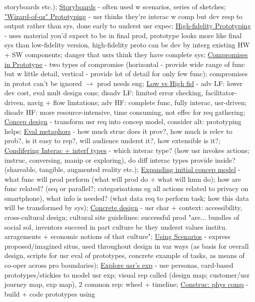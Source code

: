 \documentclass[a4paper]{article}
\begin{document}
\begin{multicols}{3}
        storyboards etc.); \underline{Storyboards} - often used w scenarios, series of sketches; \underline{"Wizard-of-oz" Prototyping} - usr thinks they're interac w comp but dev resp to output rather than sys,
        done early to underst usr expec; \underline{High-fidelity Prototyping} - uses material you'd expect to be in final prod, prototype looks more like final sys than low-fidelity version, high-fidelity proto can
        be dev by interg existing HW + SW components; danger that usrs think they have complete sys; \underline{Compromises in Prototype} - two types of compromise (horizontal - provide wide range of func but
        w little detail, vertical - provide lot of detail for only few func); compromises in protot can't be ignored $\to$ prod needs eng; \underline{Low vs High fid} - adv LF: lower dev cost, eval mult design cons;
        disadv LF: limited error checking, facilitator-driven, navig + flow limtations; adv HF: complete func, fully interac, usr-driven; disadv HF: more resource-intensive, time consuming, not effec for req gathering;
        \underline{Concep design} - transform usr req into concep model, consider alt: prototyping helps; \underline{Eval metaphors} - how much struc does it prov?, how much is relev to prob?, is it easy to rep?,
        will audience underst it?, how extensible is it?; \underline{Condifering Interac + interf types} - which interac type? (how usr invokes actions; instruc, conversing, manip or exploring), do diff interac
        types provide inside? (shareable, tangible, augmented reality etc.); \underline{Expanding initial concep model} - what func will prod perform (what will prod do + what will hmn do); how are func related?
        (seq or parallel?; categorisations eg all actions related to privacy on smartphone), what info is needed? (what data req to perform task; how this data will be transformed by sys);
        \underline{Concrete design} - usr char + context: accessibility, cross-cultural design; cultural site guidelines: successful prod "are... bundles of social sol, inventors succeed in
        part culture bc they underst values institu. arragements + economic notions of that culture"; \underline{Using Scenarios} - express proposed/imagined situs, used throughout design in var ways (as
        basis for overall design, scripts for usr eval of prototypes, concrete example of tasks, as means of co-oper across pro boundaries); \underline{Explore usr's exp} - use personas, card-based
        prototypes/stickies to model usr exp; visual rep called (design map; customer/usr journey map, exp map), 2 common rep: wheel + timeline; \underline{Construc: phys comp} - build + code prototypes using

\end{multicols}
\end{document}
